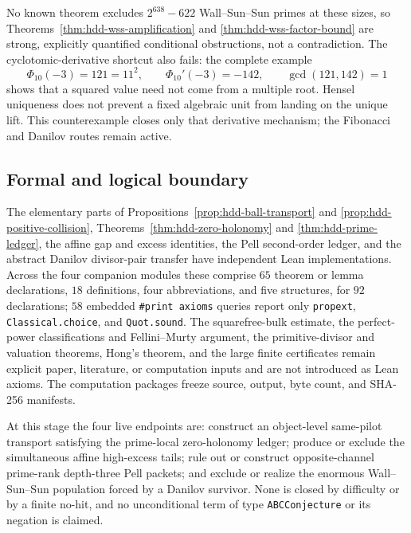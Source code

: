 No known theorem excludes $2^{638}-622$ Wall--Sun--Sun primes at these sizes,
so Theorems~\ref{thm:hdd-wss-amplification} and
\ref{thm:hdd-wss-factor-bound} are strong, explicitly quantified conditional
obstructions,
not a contradiction.  The cyclotomic-derivative shortcut also fails: the
complete example
\[
 \Phi_{10}(-3)=121=11^2,\qquad \Phi_{10}'(-3)=-142,
 \qquad \gcd(121,142)=1
\]
shows that a squared value need not come from a multiple root.  Hensel
uniqueness does not prevent a fixed algebraic unit from landing on the unique
lift.  This counterexample closes only that derivative mechanism; the
Fibonacci and Danilov routes remain active.

\subsection{Formal and logical boundary}

The elementary parts of Propositions~\ref{prop:hdd-ball-transport} and
\ref{prop:hdd-positive-collision}, Theorems~\ref{thm:hdd-zero-holonomy} and
\ref{thm:hdd-prime-ledger}, the affine gap and excess identities, the Pell
second-order ledger, and the abstract Danilov divisor-pair transfer have
independent Lean implementations.  Across the four companion modules these
comprise $65$ theorem or lemma declarations, $18$ definitions, four
abbreviations, and five structures, for $92$ declarations; $58$ embedded
\texttt{\#print axioms} queries report only \texttt{propext},
\texttt{Classical.choice}, and \texttt{Quot.sound}.  The squarefree-bulk
estimate, the perfect-power classifications and Fellini--Murty argument, the
primitive-divisor and valuation theorems, Hong's theorem, and the large finite
certificates remain explicit paper, literature, or computation inputs and are
not introduced as Lean axioms.  The computation packages freeze source,
output, byte count, and SHA-256 manifests.

At this stage the four live endpoints are: construct an object-level
same-pilot transport satisfying the prime-local zero-holonomy ledger; produce
or exclude the simultaneous affine high-excess tails; rule out or construct
opposite-channel prime-rank depth-three Pell packets; and exclude or realize
the enormous Wall--Sun--Sun population forced by a Danilov survivor.  None is
closed by difficulty or by a finite no-hit, and no unconditional term of type
\texttt{ABCConjecture} or its negation is claimed.
